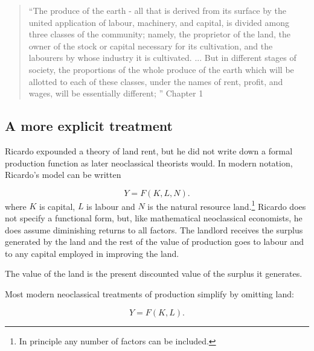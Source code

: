 \begin{quotation}   
 “The produce of the earth - all that is derived from its surface by the united application of labour, machinery, and capital, is divided among three classes of the community; namely, the proprietor of the land, the owner of the stock or capital necessary for its cultivation, and the labourers by whose industry it is cultivated. ...  But in different stages of society, the proportions of the whole produce of the earth which will be allotted to each of these classes, under the names of rent, profit, and wages, will be essentially different; ”  Chapter 1
\end{quotation}



\subsection{A more explicit treatment}
Ricardo expounded a theory of land rent, but he did not write down a formal production function as later neoclassical theorists would. In modern notation, Ricardo's model can be written


\begin{equation} 
Y=F(K,L,N).
\label{Eqn:Prod1}
\end{equation} 
where $K$ is capital, $L$ is labour and $N$  is the natural resource  land.\footnote{In principle any number of factors can be included.} 
Ricardo does not specify a functional form, but, like mathematical neoclassical economists, he does assume diminishing returns to all factors. The landlord  receives the surplus generated by the land and the rest of the value of production goes to labour and to any capital employed in improving the land. 

The value of the land is the present discounted value of the surplus it generates.

Most modern neoclassical treatments of production simplify by omitting land: 

\begin{equation} 
Y=F(K,L).
\label{Eqn:Prod1}
\end{equation} 

